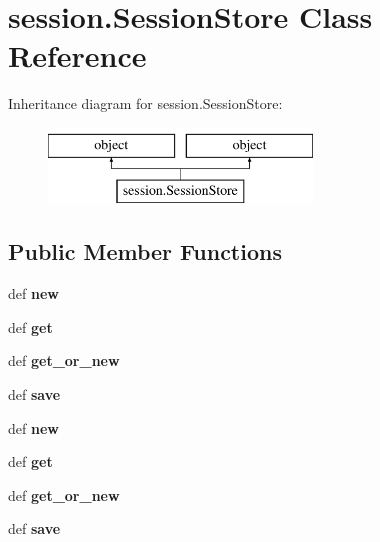\hypertarget{classsession_1_1SessionStore}{\section{session.\-Session\-Store Class Reference}
\label{classsession_1_1SessionStore}
}
Inheritance diagram for session.\-Session\-Store\-:\begin{figure}[H]
\begin{center}
\leavevmode
\includegraphics[height=2.000000cm]{classsession_1_1SessionStore}
\end{center}
\end{figure}
\subsection*{Public Member Functions}
\begin{DoxyCompactItemize}
\item 
\hypertarget{classsession_1_1SessionStore_aa8a9de02e72668c7870695ecb96486cc}{def {\bfseries new}}\label{classsession_1_1SessionStore_aa8a9de02e72668c7870695ecb96486cc}

\item 
\hypertarget{classsession_1_1SessionStore_a99853f3f868737b2dbc2928747cd9c7a}{def {\bfseries get}}\label{classsession_1_1SessionStore_a99853f3f868737b2dbc2928747cd9c7a}

\item 
\hypertarget{classsession_1_1SessionStore_a4add87957b4e0c37501693d2e5a095bc}{def {\bfseries get\-\_\-or\-\_\-new}}\label{classsession_1_1SessionStore_a4add87957b4e0c37501693d2e5a095bc}

\item 
\hypertarget{classsession_1_1SessionStore_a46e93026fe273ce3b050e0f1b88d05b3}{def {\bfseries save}}\label{classsession_1_1SessionStore_a46e93026fe273ce3b050e0f1b88d05b3}

\item 
\hypertarget{classsession_1_1SessionStore_aa8a9de02e72668c7870695ecb96486cc}{def {\bfseries new}}\label{classsession_1_1SessionStore_aa8a9de02e72668c7870695ecb96486cc}

\item 
\hypertarget{classsession_1_1SessionStore_a99853f3f868737b2dbc2928747cd9c7a}{def {\bfseries get}}\label{classsession_1_1SessionStore_a99853f3f868737b2dbc2928747cd9c7a}

\item 
\hypertarget{classsession_1_1SessionStore_a4add87957b4e0c37501693d2e5a095bc}{def {\bfseries get\-\_\-or\-\_\-new}}\label{classsession_1_1SessionStore_a4add87957b4e0c37501693d2e5a095bc}

\item 
\hypertarget{classsession_1_1SessionStore_a46e93026fe273ce3b050e0f1b88d05b3}{def {\bfseries save}}\label{classsession_1_1SessionStore_a46e93026fe273ce3b050e0f1b88d05b3}

\end{DoxyCompactItemize}
